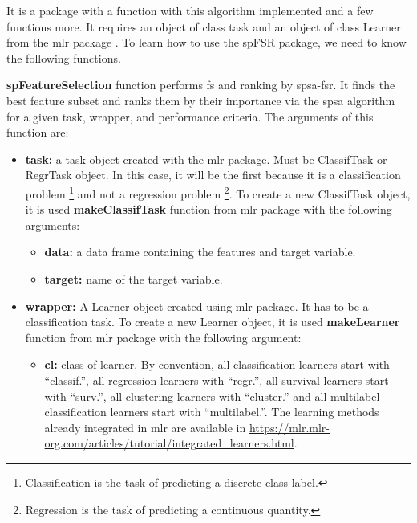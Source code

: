 It is a package with a function with this algorithm implemented and a few functions more. It requires
an object of class task and an object of class Learner from the mlr package \cite{mlr}. To learn how to use the spFSR package, we need to know the following functions.

\textbf{spFeatureSelection} function performs \acrshort{fs} and ranking by \acrshort{spsa-fsr}. It finds the best feature subset and ranks them by their importance via the \acrfull{spsa} algorithm for a given task, wrapper, and performance criteria. The arguments of this function are:

\begin{itemize}
    \item \textbf{task:} a task object created with the mlr package. Must be ClassifTask or RegrTask object. In this case, it will be the first because it is a classification problem \footnote{Classification is the task of predicting a discrete class label.} and not a regression problem \footnote{Regression is the task of predicting a continuous quantity.}. To create a new ClassifTask object, it is used \textbf{makeClassifTask} function from mlr package with the following arguments:
    
    \begin{itemize}
        \item \textbf{data:} a data frame containing the features and target variable.
        
        \item \textbf{target:} name of the target variable.
    \end{itemize}
    
    \item \textbf{wrapper:} A Learner object created using mlr package. It has to be a classification task. To create a new Learner object, it is used \textbf{makeLearner} function from mlr package with the following argument:
    
    \begin{itemize}
        \item \textbf{cl:} class of learner. By convention, all classification learners start with “classif.”, all regression learners with “regr.”, all survival learners start with “surv.”, all clustering learners with “cluster.” and all multilabel classification learners start with “multilabel.”. The learning methods already integrated in mlr are available in \url{https://mlr.mlr-org.com/articles/tutorial/integrated_learners.html}.
    \end{itemize}
    

\end{itemize}
